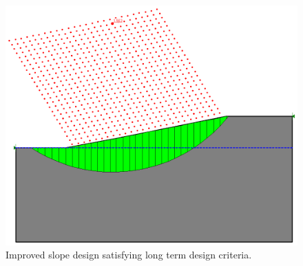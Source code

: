 \documentclass[a4paper]{article}
\begin{document}
\begin{center}
\begin{figure}[ht]
\includegraphics{drained_modified}
\caption{Improved slope design satisfying long term design criteria.}
\label{fig:drained_modified}
\end{figure}
\end{center}
\end{document}
